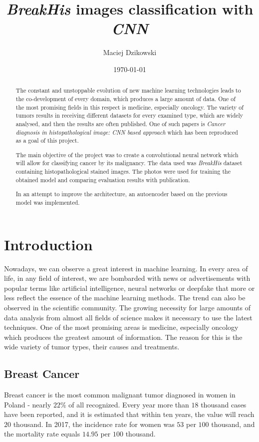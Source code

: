 \documentclass[12pt]{article}
\title{\textit{\textit{BreakHis}} images classification with \textit{CNN}}
\author{Maciej Dzikowski}
\date{\today}
\begin{document}
\maketitle
     
\begin{abstract}
The constant and unstoppable evolution of new machine learning technologies leads to the co-development of every domain, which produces a large amount of data. One of the most promising fields in this respect is medicine, especially oncology. The variety of tumors results in receiving different datasets for every examined type, which are widely analysed, and then the results are often published. One of such papers is \textit{Cancer diagnosis in histopathological image: CNN based approach}\cite{1} which has been reproduced as a goal of this project.

The main objective of the project was to create a convolutional neural network which will allow for classifying cancer by its malignancy. The data used was \textit{BreakHis} dataset\cite{2} containing histopathological stained images. The photos were used for training the obtained model and comparing evaluation results with publication.

In an attempt to improve the architecture, an autoencoder based on the previous model was implemented.
\end{abstract}



\section{Introduction}
Nowadays, we can observe a great interest in machine learning. In every area of life, in any field of interest, we are bombarded with news or advertisements with popular terms like artificial intelligence, neural networks or deepfake that more or less reflect the essence of the machine learning methods. The trend can also be observed in the scientific community. The growing necessity for large amounts of data analysis from almost all fields of science makes it necessary to use the latest techniques. One of the most promising areas is medicine, especially oncology which produces the greatest amount of information. The reason for this is the wide variety of tumor types, their causes and treatments.


\subsection{Breast Cancer}
Breast cancer is the most common malignant tumor diagnosed in women in Poland - nearly $22\%$ of all recognized. Every year more than $18$ thousand cases have been reported, and it is estimated that within ten years, the value will reach $20$ thousand. In 2017, the incidence rate for women was $53$ per $100$ thousand, and the mortality rate equals $14.95$ per $100$ thousand\cite{3}.
\end{document}
